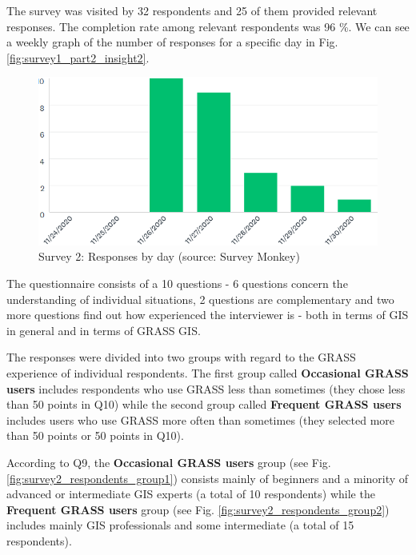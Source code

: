 \documentclass[a4paper,10pt,twoside]{article}
\begin{document}
\noindent The survey was visited by 32 respondents and 25 of them provided relevant responses. The completion rate among relevant respondents was 96 \%. We can see a weekly graph  of the number of responses for a specific day in Fig. \ref{fig:survey1_part2_insight2}.

\vspace{0.3cm}
\begin{figure}[hbt!] 
\begin{center}
\includegraphics[width=12cm]{../surveys/analyzed_data/survey2_insight2.png} 
\caption[Survey 2: Responses by day]{Survey 2: Responses by day (source: Survey Monkey)}
\label{fig:survey2_insight2}
\end{center}
\end{figure}

\noindent The questionnaire consists of a 10 questions - 6 questions concern the understanding of individual situations, 2 questions are complementary and two more questions find out how experienced the interviewer is - both in terms of GIS in general and in terms of GRASS GIS. 

The responses were divided into two groups with regard to the GRASS experience of individual respondents. The first group called \textbf{Occasional GRASS users} includes respondents who use GRASS less than sometimes (they chose less than 50 points in Q10) while the second group called \textbf{Frequent GRASS users} includes users who use GRASS more often than sometimes (they selected more than 50 points or 50 points in Q10). 

According to Q9, the \textbf{Occasional GRASS users} group (see Fig. \ref{fig:survey2_respondents_group1}) consists mainly of beginners and a minority of advanced or intermediate GIS experts (a total of 10 respondents) while the \textbf{Frequent GRASS users} group (see Fig. \ref{fig:survey2_respondents_group2}) includes mainly GIS professionals and some intermediate (a total of 15 respondents).
\end{document}
